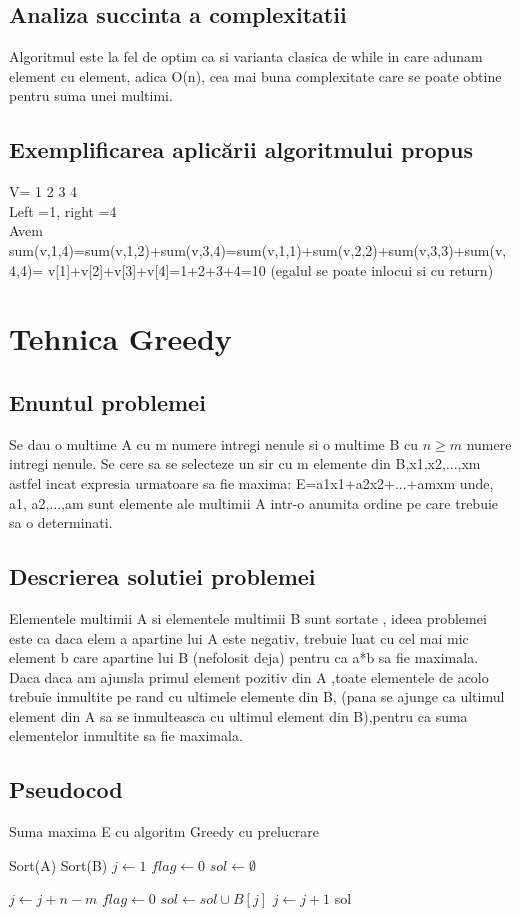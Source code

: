 \documentclass[runningheads]{llncs}
\begin{document}
\subsection{Analiza succinta a complexitatii}
Algoritmul este la fel de optim ca si varianta clasica de while in care adunam element cu element, adica O(n), cea mai buna complexitate care se poate obtine pentru suma unei multimi.
\subsection{Exemplificarea aplicării algoritmului propus}
V= 1 2 3 4\\
Left =1, right =4\\
Avem sum(v,1,4)=sum(v,1,2)+sum(v,3,4)=sum(v,1,1)+sum(v,2,2)+sum(v,3,3)+sum(v,4,4)=
v[1]+v[2]+v[3]+v[4]=1+2+3+4=10 (egalul se poate inlocui si cu return)
\newpage
\section{Tehnica Greedy }
\subsection{Enuntul problemei}
Se dau o multime A cu m numere intregi nenule si o multime B cu $n\ge m$ numere intregi nenule. Se cere sa se selecteze un sir cu m elemente din B,x1,x2,...,xm astfel incat expresia urmatoare sa fie maxima: E=a1x1+a2x2+...+amxm  unde, a1, a2,...,am sunt elemente ale multimii A intr-o anumita ordine pe care trebuie sa o determinati. 
\subsection{Descrierea solutiei problemei}
Elementele multimii A si elementele multimii B sunt sortate , ideea problemei este ca daca elem a apartine lui A este negativ, trebuie luat cu cel mai mic element b care apartine lui B (nefolosit deja) pentru ca a*b sa fie maximala. Daca daca am ajunsla primul element pozitiv din A ,toate elementele de acolo trebuie inmultite pe rand cu ultimele elemente din B, (pana se ajunge ca ultimul element din A sa se inmulteasca cu ultimul element din B),pentru ca suma elementelor inmultite sa fie maximala.
\subsection{Pseudocod}
\begin{algorithm}
\caption{Suma maxima E cu algoritm Greedy cu prelucrare}\label{euclid}
\begin{algorithmic}[1]
\State Sort(A)
\State Sort(B)
\State $j\gets 1$
\State $flag\gets 0$
\State $sol\gets \emptyset$

\State $j\gets j+n-m$
\State $flag\gets 0$
\EndIf
\State $sol\gets sol \cup B[j]$
\State $j\gets j + 1$
\EndFor
\Return sol
\EndProcedure
\end{algorithmic}
\end{algorithm}
\end{document}
